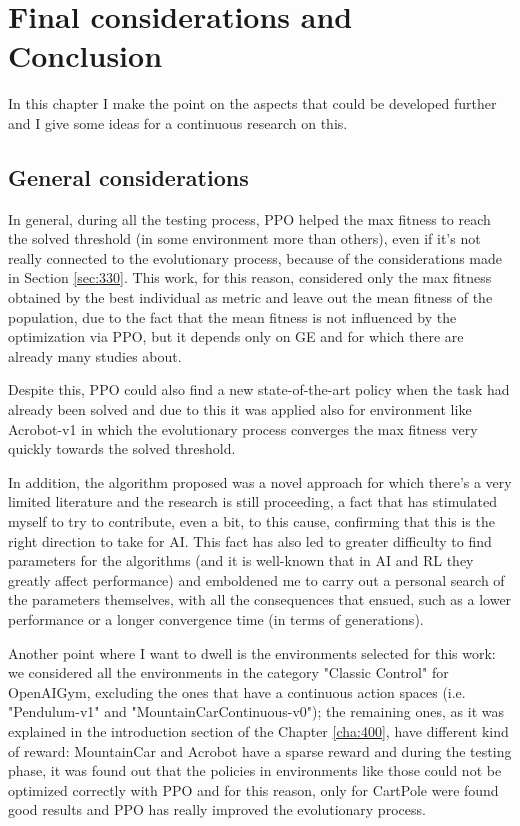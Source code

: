 \chapter{Final considerations and Conclusion}
\label{cha:500}
In this chapter I make the point on the aspects that could be developed further and I give some ideas for a continuous research on this.


\section{General considerations}
\label{sec:510}
In general, during all the testing process, PPO helped the max fitness to reach the solved threshold (in some environment more than others), even if it's not really connected to the evolutionary process, because of the considerations made in Section \ref{sec:330}. This work, for this reason, considered only the max fitness obtained by the best individual as metric and leave out the mean fitness of the population, due to the fact that the mean fitness is not influenced by the optimization via PPO, but it depends only on GE and for which there are already many studies about.

Despite this, PPO could also find a new state-of-the-art policy when the task had already been solved and due to this it was applied also for environment like Acrobot-v1 in which the evolutionary process converges the max fitness very quickly towards the solved threshold.

In addition, the algorithm proposed was a novel approach for which there's a very limited literature and the research is still proceeding, a fact that has stimulated myself to try to contribute, even a bit, to this cause, confirming that this is the right direction to take for AI. This fact has also led to greater difficulty to find parameters for the algorithms (and it is well-known that in AI and RL they greatly affect performance) and emboldened me to carry out a personal search of the parameters themselves, with all the consequences that ensued, such as a lower performance or a longer convergence time (in terms of generations).

Another point where I want to dwell is the environments selected for this work: we considered all the environments in the category "Classic Control" for OpenAIGym, excluding the ones that have a continuous action spaces (i.e. "Pendulum-v1" and "MountainCarContinuous-v0"); the remaining ones, as it was explained in the introduction section of the Chapter \ref{cha:400}, have different kind of reward: MountainCar and Acrobot have a sparse reward and during the testing phase, it was found out that the policies in environments like those could not be optimized correctly with PPO and for this reason, only for CartPole were found good results and PPO has really improved the evolutionary process.

